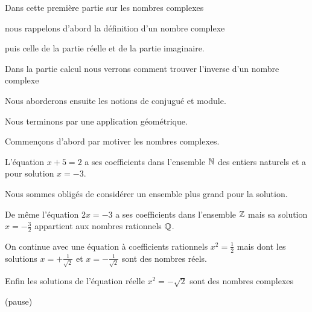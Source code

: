 







\debuttexte



\diapo

\change

Dans cette première partie sur les nombres complexes

\change

nous rappelons d'abord la définition d'un nombre complexe

\change

puis celle de la partie réelle et de la partie imaginaire.

\change 

Dans la partie calcul nous verrons comment trouver l'inverse
d'un nombre complexe

\change

Nous aborderons ensuite les notions de conjugué et module.

Nous terminons par une application géométrique.


\diapo


Commençons d'abord par motiver les nombres complexes.

L'équation $x+5=2$ a ses coefficients dans l'ensemble $\mathbb{N}$ des entiers naturels
et a pour solution $x=-3$.

Nous sommes obligés de considérer un ensemble plus grand pour la solution.

\change

De même l'équation $2x=-3$ a ses coefficients dans l'ensemble $\mathbb{Z}$ mais sa solution
$x= -\frac 32$ appartient aux nombres rationnels $\mathbb{Q}$.

\change

On continue avec une équation à coefficients rationnels $x^2= \frac 12$
mais dont les solutions $x = + \frac 1 {\sqrt 2}$ et $x = - \frac 1 {\sqrt 2}$
sont des nombres réels.

\change

Enfin les solutions de l'équation réelle $x^2 = - \sqrt 2$ sont des nombres complexes


\change

(pause)

